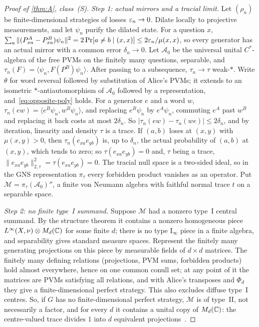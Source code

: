\begin{proof}[Proof of \cref{thm:A}, class~(S)]
\emph{Step 1: actual mirrors and a tracial limit.} Let $(\rho_n)$ be finite-dimensional strategies of losses
$\varepsilon_n\to0$. Dilate locally to projective measurements, and let $\psi_n$ purify the dilated state. For a question $x$,
$\sum_a\|(P^A_{xa}-P^B_{xa})\psi_n\|^2=2\Pr[a\ne b\mid(x,x)]\le2\varepsilon_n/\mu(x,x)$, so every generator has an actual mirror
with a common error $\delta_n\to0$. Let $\mathcal A_0$ be the universal unital $C^*$-algebra of the free PVMs on the
finitely many questions, separable, and $\tau_n(F)=\langle\psi_n,F(P^B)\psi_n\rangle$. After passing to a subsequence,
$\tau_n\to\tau$ weak-$*$. Write $\theta$ for word reversal followed by substitution of Alice's PVMs; it extends to an
isometric $*$-antiautomorphism of $\mathcal A_0$ followed by a representation, and~\eqref{eq:opposite-poly} holds. For a
generator $e$ and a word $w$,
$\tau_n(ew)=\langle e^B\psi_n,w^B\psi_n\rangle$, and replacing $e^B\psi_n$ by $e^A\psi_n$, commuting $e^A$ past $w^B$ and
replacing it back costs at most $2\delta_n$. So $|\tau_n(ew)-\tau_n(we)|\le2\delta_n$, and by iteration, linearity and
density $\tau$ is a trace. If $(a,b)$ loses at $(x,y)$ with $\mu(x,y)>0$, then $\tau_n(e_{xa}e_{yb})$ is, up to $\delta_n$,
the actual probability of $(a,b)$ at $(x,y)$, which tends to zero; so $\tau(e_{xa}e_{yb})=0$ and, $\tau$ being a trace,
$\|e_{xa}e_{yb}\|_{2,\tau}^2=\tau(e_{xa}e_{yb})=0$. The tracial null space is a two-sided ideal, so in the GNS representation
$\pi_\tau$ every forbidden product vanishes as an operator. Put $\mathcal M=\pi_\tau(\mathcal A_0)''$, a finite von Neumann
algebra with faithful normal trace $t$ on a separable space.

\emph{Step 2: no finite type~I summand.} Suppose $\mathcal M$ had a nonzero type~I central summand. By the structure
theorem it contains a nonzero homogeneous piece $L^\infty(X,\nu)\otimes M_d(\mathbb C)$ for some finite $d$; there is no type
$\mathrm{I}_\infty$ piece in a finite algebra, and separability gives standard measure spaces. Represent the finitely many
generating projections on this piece by measurable fields of $d\times d$ matrices. The finitely many defining relations
(projections, PVM sums, forbidden products) hold almost everywhere, hence on one common conull set; at any point of it the
matrices are PVMs satisfying all relations, and with Alice's transposes and $\Phi_d$ they give a finite-dimensional
perfect strategy. This also excludes diffuse type~I centres. So, if $G$ has no finite-dimensional perfect strategy,
$\mathcal M$ is of type~II, not necessarily a factor, and for every $d$ it contains a unital copy of $M_d(\mathbb C)$: the
centre-valued trace divides $1$ into $d$ equivalent projections~\cite[Lemma~1.4]{CETW22}.


\end{proof}
